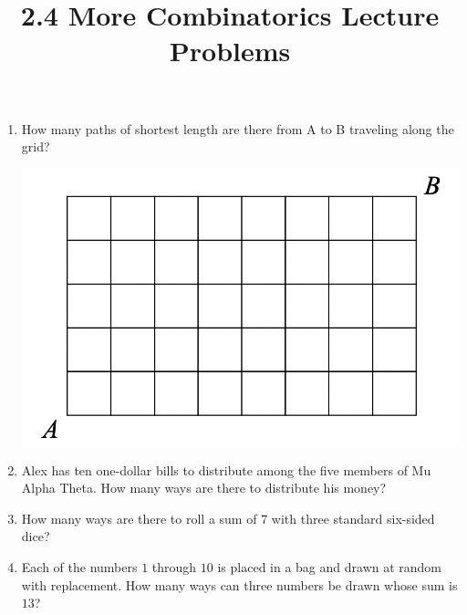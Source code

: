 \documentclass{article}
\title{2.4 More Combinatorics Lecture Problems}
\author{}
\date{}
\begin{document}
\maketitle

\begin{enumerate}
    \item How many paths of shortest length are there from A to B traveling along the grid?
    \begin{center}
        \includegraphics[scale=0.5]{paths.png}
    \end{center}
        \vspace{3cm}
    \item Alex has ten one-dollar bills to distribute among the five members of Mu Alpha Theta.
		How many ways are there to distribute his money?
		\vspace{3cm}
	\item How many ways are there to roll a sum of $7$ with three standard six-sided dice?
		\vspace{3cm}
	\item Each of the numbers $1$ through $10$ is placed in a bag and drawn at random with replacement.
		How many ways can three numbers be drawn whose sum is $13$?
		\vspace{3cm}
\end{enumerate}
\end{document}
